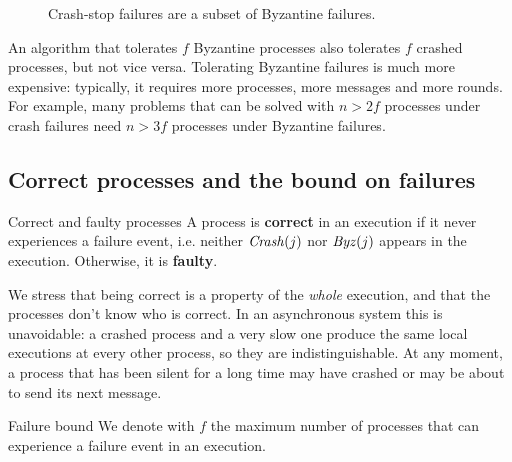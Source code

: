 \begin{figure}[H]
  \centering
  \caption{Crash-stop failures are a subset of Byzantine failures.}
  \label{fig:failure-inclusion}
\end{figure}

\begin{framedobs}{}
  An algorithm that tolerates $f$ Byzantine processes also tolerates $f$ crashed processes, but not vice versa. Tolerating Byzantine failures is much more expensive: typically, it requires more processes, more messages and more rounds. For example, many problems that can be solved with $n > 2f$ processes under crash failures need $n > 3f$ processes under Byzantine failures.
\end{framedobs}

\subsection{Correct processes and the bound on failures}

\begin{frameddefn}{Correct and faulty processes}
  A process is \textbf{correct} in an execution if it never experiences a failure event, i.e. neither $\mathit{Crash}(j)$ nor $\mathit{Byz}(j)$ appears in the execution. Otherwise, it is \textbf{faulty}.
\end{frameddefn}

We stress that being correct is a property of the \textit{whole} execution, and that the processes don't know who is correct. In an asynchronous system this is unavoidable: a crashed process and a very slow one produce the same local executions at every other process, so they are indistinguishable. At any moment, a process that has been silent for a long time may have crashed or may be about to send its next message.

\begin{frameddefn}{Failure bound}
  We denote with $f$ the maximum number of processes that can experience a failure event in an execution.
\end{frameddefn}


